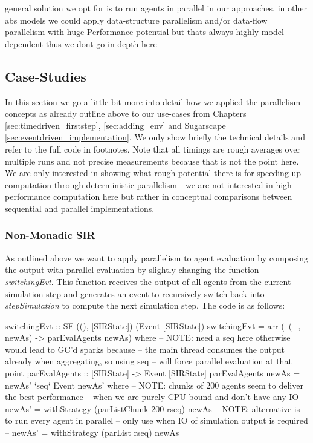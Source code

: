 
general solution we opt for is  to run agents in parallel in our approaches. in other abs models we could apply data-structure parallelism and/or data-flow parallelism with huge Performance potential but thats always highly model dependent thus we dont go in depth here

\subsection{Case-Studies}
In this section we go a little bit more into detail how we applied the parallelism concepts as already outline above to our use-cases from Chapters \ref{sec:timedriven_firststep}, \ref{sec:adding_env} and Sugarscape \ref{sec:eventdriven_implementation}. We only show briefly the technical details and refer to the full code in footnotes. Note that all timings are rough averages over multiple runs and not precise measurements because that is not the point here. We are only interested in showing what rough potential there is for speeding up computation through deterministic parallelism - we are not interested in high performance computation here but rather in conceptual comparisons between sequential and parallel implementations.

\subsubsection{Non-Monadic SIR}
\label{parallel_nonmonadic_sir}
As outlined above we want to apply parallelism to agent evaluation by composing the output with parallel evaluation by slightly changing the function \textit{switchingEvt}. This function receives the output of all agents from the current simulation step and generates an event to recursively switch back into \textit{stepSimulation} to compute the next simulation step. The code is as follows:

\begin{HaskellCode}
switchingEvt :: SF ((), [SIRState]) (Event [SIRState])
switchingEvt = arr (\ (_, newAs) -> parEvalAgents newAs)
  where
    -- NOTE: need a seq here otherwise would lead to GC'd sparks because
    -- the main thread consumes the output already when aggregating, so using seq 
    -- will force parallel evaluation at that point 
    parEvalAgents :: [SIRState] -> Event [SIRState]
    parEvalAgents newAs = newAs' `seq` Event newAs' 
      where
        -- NOTE: chunks of 200 agents seem to deliver the best performance
        -- when we are purely CPU bound and don't have any IO
        newAs' = withStrategy (parListChunk 200 rseq) newAs
        -- NOTE: alternative is to run every agent in parallel
        -- only use when IO of simulation output is required
        -- newAs' = withStrategy (parList rseq) newAs
\end{HaskellCode}

